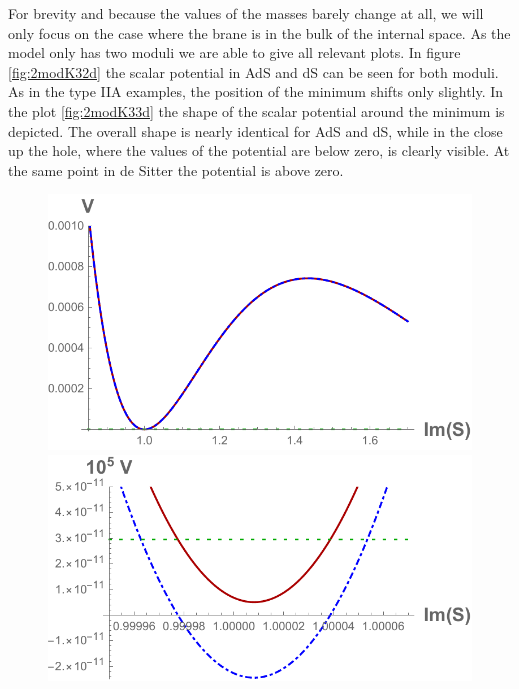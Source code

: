 \documentclass[a4paper,12pt]{report}
\begin{document}
For brevity and because the values of the masses barely change at all, we will only focus on the case where the brane is in the bulk of the internal space. As the model only has two moduli we are able to give all relevant plots. In figure \ref{fig:2modK32d} the scalar potential in AdS and dS can be seen for both moduli. As in the type IIA examples, the position of the minimum shifts only slightly. In the plot \ref{fig:2modK33d} the shape of the scalar potential around the minimum is depicted. The overall shape is nearly identical for AdS and dS, while in the close up the hole, where the values of the potential are below zero, is clearly visible. At the same point in de Sitter the potential is above zero.

\begin{figure}[htb]
\includegraphics[scale=0.52]{quevedo_314_S_large.pdf}\qquad\includegraphics[scale=0.58]{quevedo_314_S_close.pdf}

\end{figure}
\end{document}
